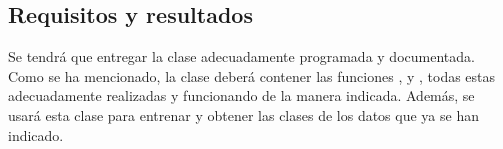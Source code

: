 \subsection{Requisitos y resultados}

Se tendrá que entregar la clase  adecuadamente programada y documentada. Como se ha mencionado, la clase deberá contener las funciones ,  y , todas estas adecuadamente realizadas y funcionando de la manera indicada. Además, se usará esta clase para entrenar y obtener las clases de los datos que ya se han indicado.
